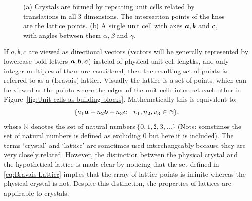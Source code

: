 \begin{figure}[H]
\begin{subfigure}[b]{0.4\textwidth}
                    \caption{}
                    \label{fig:Unit cell definition}
            \end{subfigure}
            \caption{(a) Crystals are formed by repeating unit cells related by translations in all 3 dimensions. The intersection points of the lines are the lattice points. (b) A single unit cell with axes $\boldsymbol{a}, \boldsymbol{b}$ and $\boldsymbol{c}$, with angles between them $\alpha, \beta$ and $\gamma$. \cite{drenth2012}}
    		\label{fig:Introduction-Unit Cells}
        \end{figure}
        If $a, b, c$ are viewed as directional vectors (vectors will be generally represented by lowercase bold letters {$\boldsymbol{a}, \boldsymbol{b}, \boldsymbol{c}$}) instead of physical unit cell lengths, and only integer multiples of them are considered, then the resulting set of points is referred to as a (Bravais) lattice.
        Visually the lattice is a set of points, which can be viewed as the points where the edges of the unit cells intersect each other in Figure~\ref{fig:Unit cells as building blocks}. Mathematically this is equivalent to:
        \begin{equation}
            \{n_1 \boldsymbol{a} + n_2 \boldsymbol{b} + n_3 \boldsymbol{c}\ |\ n_1, n_2, n_3 \in \mathbb{N} \},
            \label{eq:Bravais Lattice}
        \end{equation}
        where $\mathbb{N}$ denotes the set of natural numbers $\{ 0, 1, 2, 3,\ldots \}$ (Note: sometimes the set of natural numbers is defined as excluding 0 but here it is included).
        The terms `crystal' and `lattice' are sometimes used interchangeably because they are very closely related.
        However, the distinction between the physical crystal and the hypothetical lattice is made clear by noticing that the set defined in \ref{eq:Bravais Lattice} implies that the array of lattice points is infinite whereas the physical crystal is not.
        Despite this distinction, the properties of lattices are applicable to crystals.

